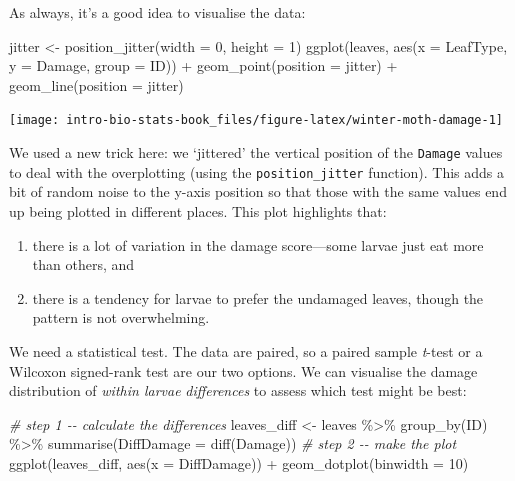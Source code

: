 \documentclass[
]{book}
\newenvironment{Shaded}{\begin{snugshade}}{\end{snugshade}}
\newcommand{\AttributeTok}[1]{\textcolor[rgb]{0.77,0.63,0.00}{#1}}
\newcommand{\CommentTok}[1]{\textcolor[rgb]{0.56,0.35,0.01}{\textit{#1}}}
\newcommand{\DecValTok}[1]{\textcolor[rgb]{0.00,0.00,0.81}{#1}}
\newcommand{\FunctionTok}[1]{\textcolor[rgb]{0.00,0.00,0.00}{#1}}
\newcommand{\NormalTok}[1]{#1}
\newcommand{\OtherTok}[1]{\textcolor[rgb]{0.56,0.35,0.01}{#1}}
\newcommand{\SpecialCharTok}[1]{\textcolor[rgb]{0.00,0.00,0.00}{#1}}
\providecommand{\tightlist}{%
  \setlength{\itemsep}{0pt}\setlength{\parskip}{0pt}}
\begin{document}
As always, it's a good idea to visualise the data:

\begin{Shaded}
\begin{Highlighting}[]
\NormalTok{jitter }\OtherTok{\textless{}{-}} \FunctionTok{position\_jitter}\NormalTok{(}\AttributeTok{width =} \DecValTok{0}\NormalTok{, }\AttributeTok{height =} \DecValTok{1}\NormalTok{)}
\FunctionTok{ggplot}\NormalTok{(leaves, }\FunctionTok{aes}\NormalTok{(}\AttributeTok{x =}\NormalTok{ LeafType, }\AttributeTok{y =}\NormalTok{ Damage, }\AttributeTok{group =}\NormalTok{ ID)) }\SpecialCharTok{+}
  \FunctionTok{geom\_point}\NormalTok{(}\AttributeTok{position =}\NormalTok{ jitter) }\SpecialCharTok{+} 
  \FunctionTok{geom\_line}\NormalTok{(}\AttributeTok{position =}\NormalTok{ jitter) }
\end{Highlighting}
\end{Shaded}

\begin{center}\texttt{[image: intro-bio-stats-book\_files/figure-latex/winter-moth-damage-1]} \end{center}

We used a new trick here: we `jittered' the vertical position of the \texttt{Damage} values to deal with the overplotting (using the \texttt{position\_jitter} function). This adds a bit of random noise to the y-axis position so that those with the same values end up being plotted in different places. This plot highlights that:

\begin{enumerate}
\def\labelenumi{\arabic{enumi}.}
\tightlist
\item
  there is a lot of variation in the damage score---some larvae just eat more than others, and
\item
  there is a tendency for larvae to prefer the undamaged leaves, though the pattern is not overwhelming.
\end{enumerate}

We need a statistical test. The data are paired, so a paired sample \emph{t}-test or a Wilcoxon signed-rank test are our two options. We can visualise the damage distribution of \emph{within larvae} \emph{differences} to assess which test might be best:

\begin{Shaded}
\begin{Highlighting}[]
\CommentTok{\# step 1 {-}{-} calculate the differences}
\NormalTok{leaves\_diff }\OtherTok{\textless{}{-}} 
\NormalTok{  leaves }\SpecialCharTok{\%\textgreater{}\%} 
  \FunctionTok{group\_by}\NormalTok{(ID) }\SpecialCharTok{\%\textgreater{}\%} 
  \FunctionTok{summarise}\NormalTok{(}\AttributeTok{DiffDamage =} \FunctionTok{diff}\NormalTok{(Damage))}
\CommentTok{\# step 2 {-}{-} make the plot}
\FunctionTok{ggplot}\NormalTok{(leaves\_diff, }\FunctionTok{aes}\NormalTok{(}\AttributeTok{x =}\NormalTok{ DiffDamage)) }\SpecialCharTok{+} 
  \FunctionTok{geom\_dotplot}\NormalTok{(}\AttributeTok{binwidth =} \DecValTok{10}\NormalTok{)}
\end{Highlighting}
\end{Shaded}
\end{document}
